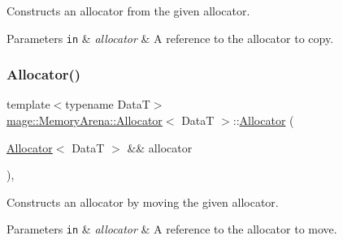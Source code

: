 Constructs an allocator from the given allocator.


\begin{DoxyParams}[1]{Parameters}
\mbox{\tt in}  & {\em allocator} & A reference to the allocator to copy. \\
\hline
\end{DoxyParams}
\hypertarget{structmage_1_1_memory_arena_1_1_allocator_a5a8abb2140b88e2ed4deb1281b4c66d6}{}\label{structmage_1_1_memory_arena_1_1_allocator_a5a8abb2140b88e2ed4deb1281b4c66d6} 
\subsubsection{\texorpdfstring{Allocator()}{Allocator()}\hspace{0.1cm}{\footnotesize\ttfamily [2/4]}}
{\footnotesize\ttfamily template$<$typename DataT$>$ \\
\hyperlink{structmage_1_1_memory_arena_1_1_allocator}{mage\+::\+Memory\+Arena\+::\+Allocator}$<$ DataT $>$\+::\hyperlink{structmage_1_1_memory_arena_1_1_allocator}{Allocator} (\begin{DoxyParamCaption}\item[{\hyperlink{structmage_1_1_memory_arena_1_1_allocator}{Allocator}$<$ DataT $>$ \&\&}]{allocator }\end{DoxyParamCaption})\hspace{0.3cm}{\ttfamily [default]}, {\ttfamily [noexcept]}}

Constructs an allocator by moving the given allocator.


\begin{DoxyParams}[1]{Parameters}
\mbox{\tt in}  & {\em allocator} & A reference to the allocator to move. \\
\hline
\end{DoxyParams}
\hypertarget{structmage_1_1_memory_arena_1_1_allocator_a9485ec7437c3c798a37c67631aa7e8ab}{}\label{structmage_1_1_memory_arena_1_1_allocator_a9485ec7437c3c798a37c67631aa7e8ab} 
